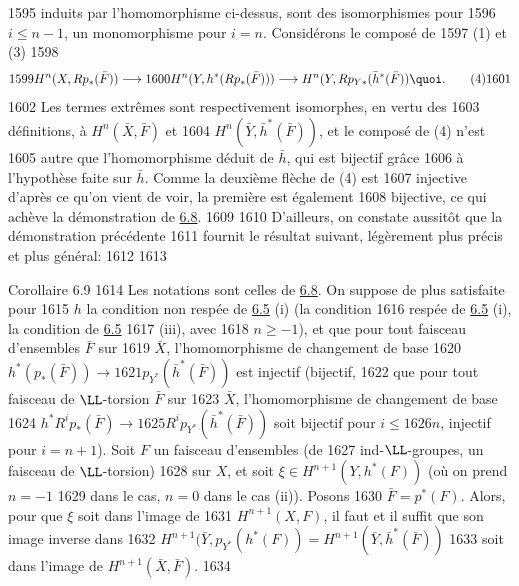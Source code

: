   1595	induits par l'homomorphisme ci-dessus, sont des isomorphismes pour
  1596	$i\leq n-1$, un monomorphisme pour $i=n$. Considérons le composé de
  1597	(1) et (3)
  1598	\begin{equation*}
  1599	H^n(X,Rp_{\ast}(\bar{F}))\longrightarrow
  1600	H^n(Y,h^{\ast}(Rp_{\ast}(\bar{F})))\longrightarrow H^n(Y,Rp_{Y\ast}(\bar{h}^{\ast}(\bar{F})){\quoi}.\tag{4}
  1601	\end{equation*}
  1602	Les termes extrêmes sont respectivement isomorphes, en vertu des
  1603	définitions, à $H^n(\bar{X},\bar{F})$ et
  1604	$H^n(\bar{Y},\bar{h}^{\ast}(\bar{F}))$, et le composé de (4) n'est
  1605	autre que l'homomorphisme déduit de $\bar{h}$, qui est bijectif grâce
  1606	à l'hypothèse faite sur $\bar{h}$. Comme la deuxième flèche de (4) est
  1607	injective d'après ce qu'on vient de voir, la première est également
  1608	bijective, ce qui achève la démonstration de \hyperref[XII.prop6.8]{6.8}.
  1609	
  1610	D'ailleurs, on constate aussitôt que la démonstration précédente
  1611	fournit le résultat suivant, légèrement plus précis et plus général:
  1612	
  1613	\begin{enonce*}{Corollaire 6.9}
  1614	Les notations sont celles de \hyperref[XII.prop6.8]{6.8}. On suppose de plus satisfaite pour
  1615	$h$ la condition non respée de \hyperref[XII.prop6.5]{6.5} {\rm(i)} (\resp la condition
  1616	respée de \hyperref[XII.prop6.5]{6.5} {\rm(i)}, \resp la condition de {\rm \hyperref[XII.prop6.5]{6.5} 
  1617	(iii)}, avec
  1618	$n\geq -1$), et que pour tout faisceau d'ensembles $\bar{F}$ sur
  1619	$\bar{X}$, l'homomorphisme de changement de base
  1620	$h^{\ast}(p_{\ast}(\bar{F}))\rightarrow
  1621	p_{Y^{\ast}}(\bar{h}^{\ast}(\bar{F}))$ est injectif (\resp bijectif,
  1622	\resp que pour tout faisceau de $\LL$-torsion $\bar{F}$ sur
  1623	$\bar{X}$, l'homomorphisme de changement de base
  1624	$h^{\ast}R^{i}p_{\ast}(\bar{F})\rightarrow
  1625	R^{i}p_{Y^{\ast}}(\bar{h}^{\ast}(\bar{F}))$ soit bijectif pour $i\leq
  1626	n$, injectif pour $i=n+1$). Soit $F$ un faisceau d'ensembles (\resp de
  1627	ind-$\LL$-groupes, \resp un faisceau de $\LL$-torsion)
  1628	sur $X$, et soit $\xi \in H^{n+1}(Y,h^{\ast}(F))$ (où on prend $n=-1$
  1629	dans le cas, $n=0$ dans le cas {\rm(ii)}). Posons
  1630	$\bar{F}=p^{\ast}(F)$. Alors, pour que $\xi$ soit dans l'image de
  1631	$H^{n+1}(X,F)$, il faut et il suffit que son image inverse dans
  1632	$H^{n+1}(\bar{Y},p_{Y^{\ast}}(h^{\ast}(F))=H^{n+1}(\bar{Y},\bar{h}^{\ast}(\bar{F}))$ 
  1633	soit dans l'image de $H^{n+1}(\bar{X},\bar{F})$.
  1634	\end{enonce*}
